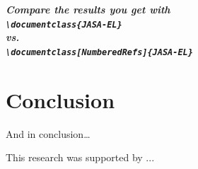 \documentclass{JASA-EL}
\begin{document}
{\bfseries\itshape
Compare the results you get with\\
{\verb+\documentclass{JASA-EL}+ }\\
vs.\\
{\verb+\documentclass[NumberedRefs]{JASA-EL}+ }
}

\section{\label{sec:5}Conclusion}

And in conclusion\ldots

\begin{acknowledgments}
This research was supported by  ...
\end{acknowledgments}


\end{document}
